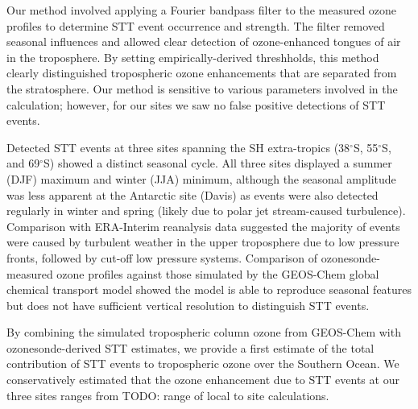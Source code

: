 \documentclass[acp, manuscript]{copernicus} %
\begin{document}
Our method involved applying a Fourier bandpass filter to the measured ozone profiles to determine STT event occurrence and strength.
The filter removed seasonal influences and allowed clear detection of ozone-enhanced tongues of air in the troposphere.
By setting empirically-derived threshholds, this method clearly distinguished tropospheric ozone enhancements that are separated from the stratosphere.
Our method is sensitive to various parameters involved in the calculation; however, for our sites we saw no false positive detections of STT events.

Detected STT events at three sites spanning the SH extra-tropics (38$^{\circ}$S, 55$^{\circ}$S, and 69$^{\circ}$S) showed a distinct seasonal cycle.
All three sites displayed a summer (DJF) maximum and winter (JJA) minimum, although the seasonal amplitude was less apparent at the Antarctic site (Davis) as events were also detected regularly in winter and spring (likely due to polar jet stream-caused turbulence).  %
Comparison with ERA-Interim reanalysis data suggested the majority of events were caused by turbulent weather in the upper troposphere due to low pressure fronts, followed by cut-off low pressure systems.
Comparison of ozonesonde-measured ozone profiles against those simulated by the GEOS-Chem global chemical transport model showed the model is able to reproduce seasonal features but does not have sufficient vertical resolution to distinguish STT events.

By combining the simulated tropospheric column ozone from GEOS-Chem with ozonesonde-derived STT estimates, we provide a first estimate of the total contribution of STT events to tropospheric ozone over the Southern Ocean.
We conservatively estimated that the ozone enhancement due to STT events at our three sites ranges from TODO: range of local to site calculations.
\end{document}
